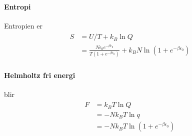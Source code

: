 \paragraph{Entropi} Entropien er
\begin{align}
\begin{split}
	S&=U/T+k_B\ln Q \\
	&=\frac{N\epsilon_0e^{-\beta\epsilon_0}}{T(1+e^{-\beta\epsilon_0})}+k_BN\ln(1+e^{-\beta\epsilon_0})
\end{split}
\end{align}

\paragraph{Helmholtz fri energi} blir
\begin{align}
\begin{split}
	F&=k_BT\ln Q \\
	&=-Nk_BT\ln q \\
	&=-Nk_BT\ln(1+e^{-\beta\epsilon_0})
\end{split}
\end{align}
